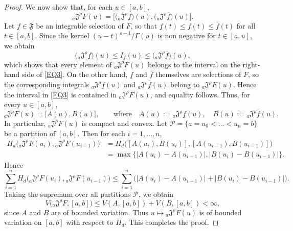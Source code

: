 \documentclass[a4paper,12pt,reqno]{amsart}
\numberwithin{equation}{section}
\theoremstyle{definition}
\theoremstyle{remark}
\numberwithin{equation}{section}
\begin{document}
\begin{proof}
We now show that, for each $u\in[a,b]$,
\begin{equation}\label{EQ3}
{}_{a}\mathfrak{J}^{\rho}F(u)
=
\Big[
\big({}_{a}\mathfrak{J}^{\rho}\underline f\big)(u),
\big({}_{a}\mathfrak{J}^{\rho}\overline f\big)(u)
\Big].
\end{equation}
Let $f\in\mathfrak{F}$ be an integrable selection of $F$, so that
$\underline f(t)\le f(t)\le\overline f(t)$ for all $t\in[a,b]$. Since the
kernel $(u-t)^{\rho-1}/\Gamma(\rho)$ is non negative for $t\in[a,u]$, we obtain
\[
\big({}_{a}\mathfrak{J}^{\rho}\underline f\big)(u)
\le I_f(u)\le
\big({}_{a}\mathfrak{J}^{\rho}\overline f\big)(u),
\] 
which shows that every element of ${}_{a}\mathfrak{J}^{\rho}F(u)$ belongs
to the interval on the right-hand side of \eqref{EQ3}. On the other hand, $\underline f$ and $\overline f$ themselves are selections of
$F$, so the corresponding integrals
${}_{a}\mathfrak{J}^{\rho}\underline f(u)$ and
${}_{a}\mathfrak{J}^{\rho}\overline f(u)$ belong to
${}_{a}\mathfrak{J}^{\rho}F(u)$. Hence the interval in
\eqref{EQ3} is contained in ${}_{a}\mathfrak{J}^{\rho}F(u)$,
and equality follows.
Thus, for every $u\in[a,b]$,
\begin{equation*}
    {}_{a}\mathfrak{J}^{\rho}F(u)
=
\big[ A(u),B(u)\big],
\qquad \text{where}\quad
A(u):={}_{a}\mathfrak{J}^{\rho}\underline f(u),\quad
B(u):={}_{a}\mathfrak{J}^{\rho}\overline f(u).
\end{equation*}
In particular, ${}_{a}\mathfrak{J}^{\rho}F(u)$ is compact and convex. Let $\mathcal{P}=\{a=u_0<\dots<u_n=b\}$ be a partition of $[a,b]$. Then for each $i=1,\dots,n$,
\begin{align*}
    H_d\big({}_{a}\mathfrak{J}^{\rho}F(u_i),{}_{a}\mathfrak{J}^{\rho}F(u_{i-1})\big)
&= H_d\big([A(u_i),B(u_i)],[A(u_{i-1}),B(u_{i-1})]\big) \\& =\max\big\{|A(u_i)-A(u_{i-1})|,
         |B(u_i)-B(u_{i-1})|\big\}.
\end{align*}
Hence
$$\sum_{i=1}^{n}
H_d\big({}_{a}\mathfrak{J}^{\rho}F(u_i),{}_{a}\mathfrak{J}^{\rho}F(u_{i-1})\big)
\le
\sum_{i=1}^{n}\Big(|A(u_i)-A(u_{i-1})|
                   +|B(u_i)-B(u_{i-1})|\Big).$$
Taking the supremum over all partitions $\mathcal{P}$, we obtain
\[
V\big({}_{a}\mathfrak{J}^{\rho}F,[a,b]\big)
\le
V(A,[a,b])+V(B,[a,b])<\infty,
\]
since $A$ and $B$ are of bounded variation. Thus
$u\mapsto{}_{a}\mathfrak{J}^{\rho}F(u)$ is of bounded variation on $[a,b]$ with respect to $H_d$. This completes the proof.
\end{proof}
\end{document}

